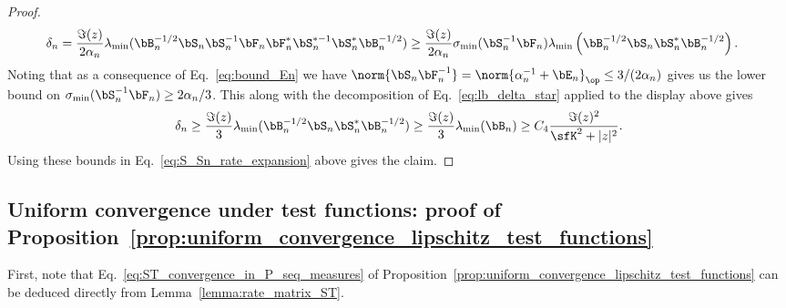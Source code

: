 \begin{proof}
\begin{align*}
    \delta_n  &= \frac{\Im(z)}{2\alpha_n} \lambda_{\min}(\bB_n^{-1/2} \bS_n \bS_n^{-1}\bF_n \bF_n^*\bS_n^{*-1}\bS_n^*\bB_n^{-1/2})
    \ge \frac{\Im(z)}{2\alpha_n} \sigma_{\min}(\bS_n^{-1} \bF_n) \lambda_{\min}\left( \bB_n^{-1/2} \bS_n \bS_n^* \bB_n^{-1/2}\right).
\end{align*}
Noting that
as a consequence of Eq.~\eqref{eq:bound_En} we have
    $\norm{\bS_n \bF_n^{-1}} = \norm{\alpha_n^{-1}+\bE_n}_\op \le  3/(2\alpha_n)$ gives us the lower bound on $\sigma_{\min}(\bS_n^{-1}\bF_n) \ge 2\alpha_n/3$.
This along with the decomposition of Eq.~\eqref{eq:lb_delta_star} applied to the display above gives 
\begin{equation}
\nonumber
    \delta_n \ge \frac{\Im(z)}{3}\lambda_{\min}(\bB_n^{-1/2} \bS_n\bS_n^* \bB_n^{-1/2}) \ge \frac{\Im(z)}{3} \lambda_{\min}(\bB_n) \ge
C_4\frac{\Im(z)^2}{\sfK^2 + |z|^2}.
\end{equation}
Using these bounds in Eq.~\eqref{eq:S_Sn_rate_expansion} above gives the claim. 
\end{proof}


\subsection{Uniform convergence under test functions: proof of Proposition~\ref{prop:uniform_convergence_lipschitz_test_functions}
}
First, note that Eq.~\eqref{eq:ST_convergence_in_P_seq_measures} of Proposition~\ref{prop:uniform_convergence_lipschitz_test_functions}
can be deduced directly from Lemma~\ref{lemma:rate_matrix_ST}.

